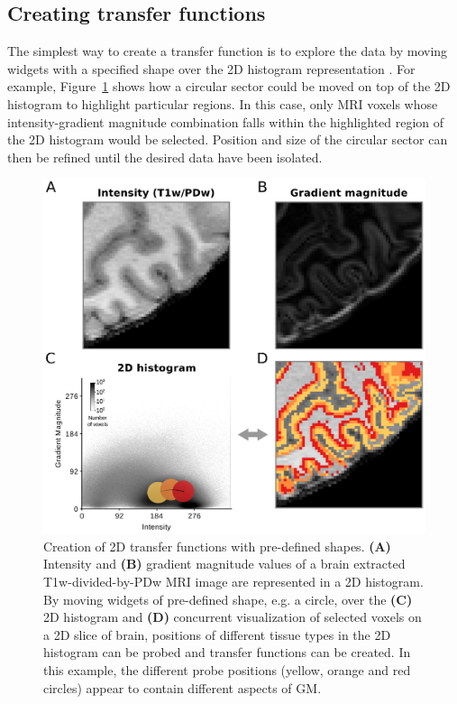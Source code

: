 \subsection{Creating transfer functions}
The simplest way to create a transfer function is to explore the data by moving widgets with a specified shape over the 2D histogram representation \parencite{Kniss2005}. For example, Figure~\ref{fig:Fig2} shows how a circular sector could be moved on top of the 2D histogram to highlight particular regions. In this case, only MRI voxels whose intensity-gradient magnitude combination falls within the highlighted region of the 2D histogram would be selected. Position and size of the circular sector can then be refined until the desired data have been isolated.

\begin{figure}[htb!]
\centering
\includegraphics[width=\textwidth]{figures/chapter_02/figure_2.eps}
\caption{Creation of 2D transfer functions with pre-defined shapes. \textbf{(A)} Intensity and \textbf{(B)} gradient magnitude values of a brain extracted T1w-divided-by-PDw MRI image are represented in a 2D histogram. By moving widgets of pre-defined shape, e.g. a circle, over the \textbf{(C)} 2D histogram and \textbf{(D)} concurrent visualization of selected voxels on a 2D slice of brain, positions of different tissue types in the 2D histogram can be probed and transfer functions can be created. In this example, the different probe positions (yellow, orange and red circles) appear to contain different aspects of GM.}
\label{fig:Fig2}
\end{figure}

